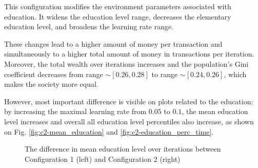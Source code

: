 \documentclass[english]{projectreport}
\begin{document}
    This configuration modifies the environment parameters associated with education. It widens the education level range, decreases the elementary education level, and broadens the learning rate range.

    These changes lead to a higher amount of money per transaction and simultaneously to a higher total amount of money in transactions per iteration. Moreover, the total wealth over iterations increases and the population's Gini coefficient decreases from range $ \sim [0.26, 0.28]$ to range $ \sim [0.24, 0.26]$, which makes the society more equal.

    However, most important difference is visible on plots related to the education: by increasing the maximal learning rate from $0.05$ to $0.1$, the mean education level increases and overall all education level percentiles also increase, as shown on Fig. \ref{fig:c2-mean_education} and \ref{fig:c2-education_perc_time}.

\begin{figure}[H]
\begin{center}
%
\end{center}
\caption{The difference in mean education level over iterations between Configuration 1 (left) and Configuration 2 (right)}
\end{figure}
\end{document}
